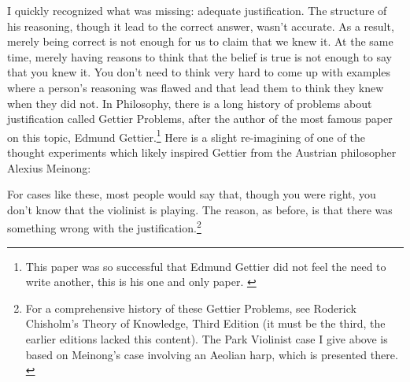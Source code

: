 
I quickly recognized what was missing: adequate \gls{justification}. The structure of his reasoning, though it lead to the correct answer, wasn't accurate. As a result, merely being correct is not enough for us to claim that we knew it. At the same time, merely having reasons to think that the belief is true is not enough to say that you knew it. You don't need to think very hard to come up with examples where a person's reasoning was flawed and that lead them to think they knew when they did not. In Philosophy, there is a long history of problems about justification called Gettier Problems, after the author of the most famous paper on this topic, Edmund Gettier.\footnote{This paper was so successful that Edmund Gettier did not feel the need to write another, this is his one and only paper. \autocite{Gettier1}} Here is a slight re-imagining of one of the thought experiments which likely inspired Gettier from the Austrian philosopher Alexius Meinong: 


For cases like these, most people would say that, though you were right, you don't know that the violinist is playing. The reason, as before, is that there was something wrong with the justification.\footnote{For a comprehensive history of these Gettier Problems, see Roderick Chisholm's Theory of Knowledge, Third Edition (it must be the third, the earlier editions lacked this content). The Park Violinist case I give above is based on Meinong's case involving an Aeolian harp, which is presented there. \autocite[p. 91-99]{Chisholm1}} 

